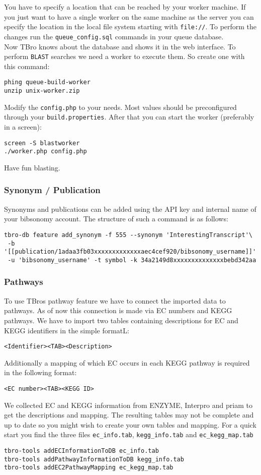 \documentclass[english]{scrartcl}
\begin{document}
You have to specify a location that can be reached by your worker machine. If
you just want to have a single worker on the same machine as the server you can
specify the location in the local file system starting with \texttt{file://}.
To perform the changes run the \texttt{queue\_config.sql} commands in your queue
database.\\
Now TBro knows about the database and shows it in the web interface. To perform
\texttt{BLAST} searches we need a worker to execute them. So create one with
this command:
\begin{lstlisting}
phing queue-build-worker
unzip unix-worker.zip
\end{lstlisting}
Modify the \texttt{config.php} to your needs. Most values should be preconfigured through
your \texttt{build.properties}. After that you can start the worker (preferably in a
screen):
\begin{lstlisting}
screen -S blastworker
./worker.php config.php
\end{lstlisting}
Have fun blasting.

\subsubsection{Synonym / Publication}
Synonyms and publications can be added using the API key and internal name of
your bibsonomy account. The structure of such a command is as follows:
\begin{lstlisting}
tbro-db feature add_synonym -f 555 --synonym 'InterestingTranscript'\ 
 -b '[[publication/1adaa3fb03xxxxxxxxxxxxxaec4cef920/bibsonomy_username]]'
 -u 'bibsonomy_username' -t symbol -k 34a2149d8xxxxxxxxxxxxxxbebd342aa
\end{lstlisting}

\subsubsection{Pathways}
To use TBros pathway feature we have to connect the imported data to
pathways. As of now this connection is made via EC numbers and KEGG pathways. We
have to import two tables containing descriptions for EC and KEGG identifiers in
the simple formatL:
\begin{lstlisting}
<Identifier><TAB><Description>
\end{lstlisting}
Additionally a mapping of which EC occurs in each KEGG pathway is required in
the following format:
\begin{lstlisting}
<EC number><TAB><KEGG ID>
\end{lstlisting}
We collected EC and KEGG information from ENZYME, Interpro
and priam to get the descriptions and mapping. The resulting tables may not be complete
and up to date so you might wish to create your own tables and mapping.
For a quick start you find the three files \texttt{ec\_info.tab},
\texttt{kegg\_info.tab} and \texttt{ec\_kegg\_map.tab}
\begin{lstlisting}
tbro-tools addECInformationToDB ec_info.tab
tbro-tools addPathwayInformationToDB kegg_info.tab
tbro-tools addEC2PathwayMapping ec_kegg_map.tab
\end{lstlisting}
\end{document}
